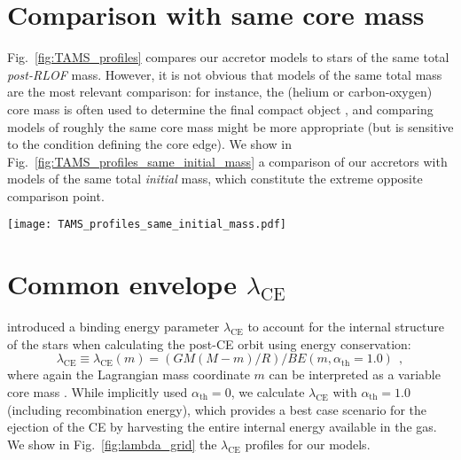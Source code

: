 \documentclass[twocolumn,twocolappendix,trackchanges]{aastex63}
\DeclareRobustCommand{\Figref}[1]{Fig.~\ref{#1}}
\begin{document}
\section{Comparison with same core mass}
\label{sec:same_core}

\Figref{fig:TAMS_profiles} compares our accretor models to stars of
the same total \emph{post-RLOF} mass. However, it is not obvious that models
of the same total mass are the most relevant comparison: for instance,
the (helium or carbon-oxygen) core mass is often used to determine the
final compact object \citep[e.g.,][]{fryer:2012, farmer:2019,
  patton:2020, renzo:2022, fryer:2022}, and comparing models of
roughly the same core mass might be more appropriate (but is sensitive
to the condition defining the core edge). We show in
\Figref{fig:TAMS_profiles_same_initial_mass} a comparison of our
accretors with models of the same total \emph{initial} mass, which
constitute the extreme opposite comparison point.


\begin{figure*}[htbp]
  \centering
  \texttt{[image: TAMS\_profiles\_same\_initial\_mass.pdf]}
  \caption{Specific entropy (top row), H (bottom row, solid lines),
    and He (bottom row, dashed lines) profiles for non-rotating single
    stars (red), accretors (orange), and ``engineered'' models of the
    same total mass as the ZAMS mass of the accretors. The overlapping
    gray bands emphasize the CEB region.}
  \label{fig:TAMS_profiles_same_initial_mass}
\end{figure*}

\section{Common envelope $\lambda_\mathrm{CE}$}
\label{sec:pop_synth_app}

\cite{dekool:1990} introduced a binding energy parameter
$\lambda_\mathrm{CE}$ to account for the internal structure of the
stars when calculating the post-CE orbit using energy conservation:
\begin{equation}
  \label{eq:lambda}
  \lambda_\mathrm{CE} \equiv \lambda_\mathrm{CE}(m) = (GM(M-m)/R)/BE(m, \alpha_\mathrm{th}=1.0) \ \ ,
\end{equation}
where again the Lagrangian mass coordinate $m$ can be interpreted as a
variable core mass \citep[see also][]{demarco:11, ivanova:2013}. While
\cite{dekool:1990} implicitly used
  $\alpha_\mathrm{th}=0$, we calculate $\lambda_\mathrm{CE}$ with
  $\alpha_\mathrm{th}=1.0$ (including recombination energy), which provides a best case scenario for
  the ejection of the CE by harvesting the entire internal energy
  available in the gas. We show
in \Figref{fig:lambda_grid} the $\lambda_\mathrm{CE}$ profiles for our models.
\end{document}
